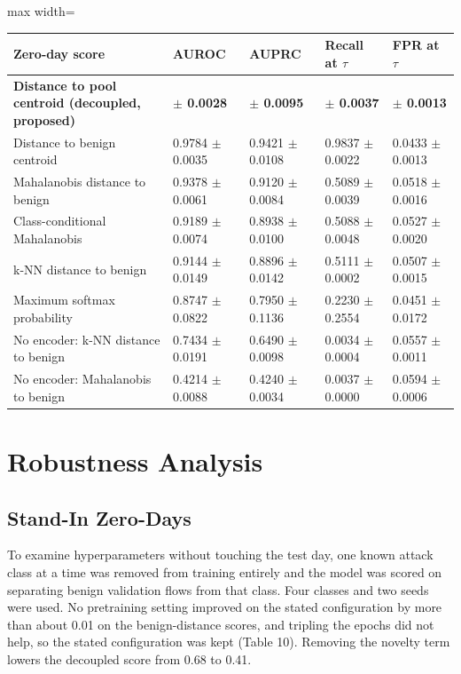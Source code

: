 \documentclass[10pt,a4paper]{article}
\begin{document}
\begin{center}
\begin{adjustbox}{max width=\linewidth}\small
\begin{tabular}{lllll}
\toprule
{\bfseries\boldmath Zero-day score} & {\bfseries\boldmath AUROC} & {\bfseries\boldmath AUPRC} & {\bfseries\boldmath Recall at $\tau$} & {\bfseries\boldmath FPR at $\tau$} \\
\midrule
{\bfseries\boldmath Distance to pool centroid (decoupled, proposed)} & {\bfseries\boldmath 0.9785 $\pm$ 0.0028} & {\bfseries\boldmath 0.9423 $\pm$ 0.0095} & {\bfseries\boldmath 0.9827 $\pm$ 0.0037} & {\bfseries\boldmath 0.0436 $\pm$ 0.0013} \\
Distance to benign centroid & 0.9784 $\pm$ 0.0035 & 0.9421 $\pm$ 0.0108 & 0.9837 $\pm$ 0.0022 & 0.0433 $\pm$ 0.0013 \\
Mahalanobis distance to benign & 0.9378 $\pm$ 0.0061 & 0.9120 $\pm$ 0.0084 & 0.5089 $\pm$ 0.0039 & 0.0518 $\pm$ 0.0016 \\
Class-conditional Mahalanobis & 0.9189 $\pm$ 0.0074 & 0.8938 $\pm$ 0.0100 & 0.5088 $\pm$ 0.0048 & 0.0527 $\pm$ 0.0020 \\
k-NN distance to benign & 0.9144 $\pm$ 0.0149 & 0.8896 $\pm$ 0.0142 & 0.5111 $\pm$ 0.0002 & 0.0507 $\pm$ 0.0015 \\
Maximum softmax probability & 0.8747 $\pm$ 0.0822 & 0.7950 $\pm$ 0.1136 & 0.2230 $\pm$ 0.2554 & 0.0451 $\pm$ 0.0172 \\
No encoder: k-NN distance to benign & 0.7434 $\pm$ 0.0191 & 0.6490 $\pm$ 0.0098 & 0.0034 $\pm$ 0.0004 & 0.0557 $\pm$ 0.0011 \\
No encoder: Mahalanobis to benign & 0.4214 $\pm$ 0.0088 & 0.4240 $\pm$ 0.0034 & 0.0037 $\pm$ 0.0000 & 0.0594 $\pm$ 0.0006 \\
\bottomrule
\end{tabular}
\end{adjustbox}
\end{center}
\section{Robustness Analysis}
\subsection{Stand-In Zero-Days}
To examine hyperparameters without touching the test day, one known attack class at a time was removed from training entirely and the model was scored on separating benign validation flows from that class. Four classes and two seeds were used. No pretraining setting improved on the stated configuration by more than about 0.01 on the benign-distance scores, and tripling the epochs did not help, so the stated configuration was kept (Table 10). Removing the novelty term lowers the decoupled score from 0.68 to 0.41.
\end{document}
